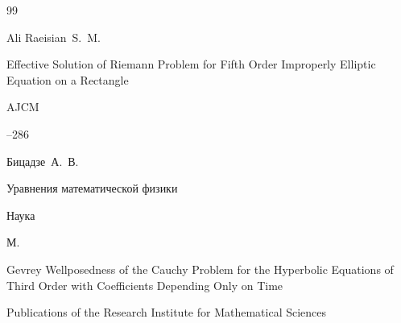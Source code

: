 




\begin{thebibliography}{99}




\by Ali Raeisian~S.~M.

\paper Effective Solution of Riemann Problem for Fifth Order Improperly Elliptic Equation on a Rectangle

\jour AJCM




--286





\by Бицадзе~А.~В.

\book Уравнения математической физики


\publ Наука

\publaddr М.



















\paper Gevrey Wellposedness of the Cauchy Problem for the Hyperbolic Equations of Third Order with Coefficients Depending Only on Time

\jour  Publications of the Research Institute for Mathematical Sciences


\end{thebibliography}

